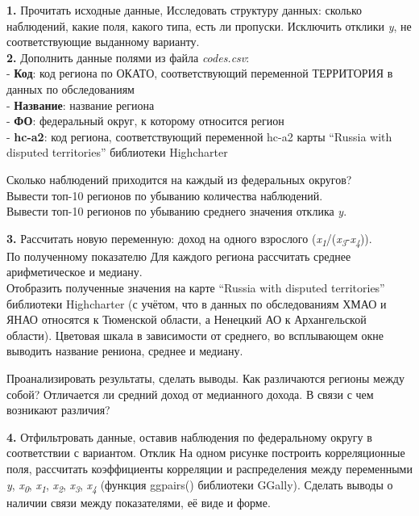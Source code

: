 \documentclass[
]{book}
\begin{document}
\textbf{1.} Прочитать исходные данные, Исследовать структуру данных: сколько наблюдений, какие поля, какого типа, есть ли пропуски. Исключить отклики \emph{y}, не соответствующие выданному варианту.\\
\textbf{2.} Дополнить данные полями из файла \emph{codes.csv}:\\
- \textbf{Код}: код региона по ОКАТО, соответствующий переменной ТЕРРИТОРИЯ в данных по обследованиям\\
- \textbf{Название}: название региона\\
- \textbf{ФО}: федеральный округ, к которому относится регион\\
- \textbf{hc-a2}: код региона, соответствующий переменной hc-a2 карты ``Russia with disputed territories'' библиотеки Highcharter

Сколько наблюдений приходится на каждый из федеральных округов?\\
Вывести топ-10 регионов по убыванию количества наблюдений.\\
Вывести топ-10 регионов по убыванию среднего значения отклика \emph{y}.

\textbf{3.} Рассчитать новую переменную: доход на одного взрослого (\emph{x}\textsubscript{\emph{1}}/(\emph{x}\textsubscript{\emph{3}}-\emph{x}\textsubscript{\emph{4}})).\\
По полученному показателю Для каждого региона рассчитать среднее арифметическое и медиану.\\
Отобразить полученные значения на карте ``Russia with disputed territories'' библиотеки Highcharter (с учётом, что в данных по обследованиям ХМАО и ЯНАО относятся к Тюменской области, а Ненецкий АО к Архангельской области). Цветовая шкала в зависимости от среднего, во всплывающем окне выводить название рениона, среднее и медиану.

Проанализировать результаты, сделать выводы. Как различаются регионы между собой? Отличается ли средний доход от медианного дохода. В связи с чем возникают различия?

\textbf{4.} Отфильтровать данные, оставив наблюдения по федеральному округу в соответствии с вариантом. Отклик
На одном рисунке построить корреляционные поля, рассчитать коэффициенты корреляции и распределения между переменными \emph{y}, \emph{x}\textsubscript{\emph{0}}, \emph{x}\textsubscript{\emph{1}}, \emph{x}\textsubscript{\emph{2}}, \emph{x}\textsubscript{\emph{3}}, \emph{x}\textsubscript{\emph{4}} (функция ggpairs() библиотеки GGally). Сделать выводы о наличии связи между показателями, её виде и форме.
\end{document}
